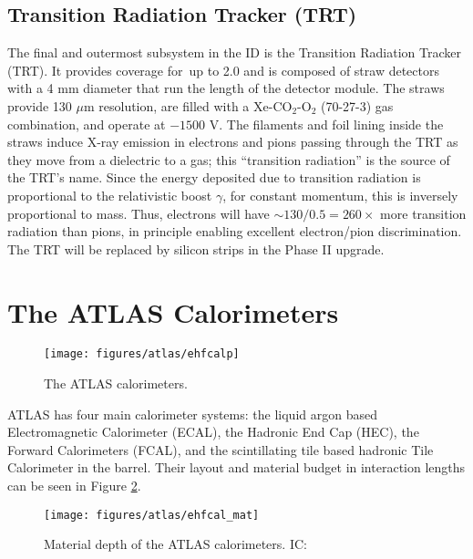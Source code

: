 \subsection{Transition Radiation Tracker (TRT)}
The final and outermost subsystem in the ID is the Transition Radiation Tracker (TRT).  It provides coverage for \aeta\,up to 2.0 and is composed of straw detectors with a 4 mm diameter that run the length of the detector module.  The straws provide 130 $\mu$m resolution, are filled with a Xe-CO$_2$-O$_2$ (70-27-3) gas combination, and operate at $-1500$ V.  The filaments and foil lining inside the straws induce X-ray emission in electrons and pions passing through the TRT as they move from a dielectric to a gas; this ``transition radiation'' is the source of the TRT's name.  Since the energy deposited due to transition radiation is proportional to the relativistic boost $\gamma$, for constant momentum, this is inversely proportional to mass.  Thus, electrons will have $\sim 130/0.5=260\times$ more transition radiation than pions, in principle enabling excellent electron/pion discrimination.  The TRT will be replaced by silicon strips in the Phase II upgrade.


\section{The ATLAS Calorimeters}
\begin{figure}[!htbp]\captionsetup{justification=centering}
  \centering
  \texttt{[image: figures/atlas/ehfcalp]}
  \caption{The ATLAS calorimeters.}
  \label{fig:indet}
\end{figure}

ATLAS has four main calorimeter systems: the liquid argon based Electromagnetic Calorimeter (ECAL), the Hadronic End Cap (HEC), the Forward Calorimeters (FCAL), and the scintillating tile based hadronic Tile Calorimeter in the barrel.  Their layout and material budget in interaction lengths can be seen in Figure \ref{fig:calbudget}.
\begin{figure}[!htbp]\captionsetup{justification=centering}
  \centering
  \texttt{[image: figures/atlas/ehfcal\_mat]}
  \caption{Material depth of the ATLAS calorimeters. IC: \cite{jinstpaper}}
  \label{fig:calbudget}
\end{figure}

